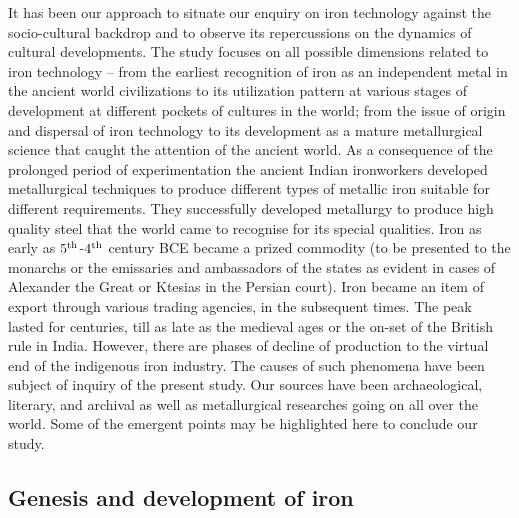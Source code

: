 It has been our approach to situate our enquiry on iron technology against the socio-cultural backdrop and to observe its repercussions on the dynamics of cultural developments. The study focuses on all possible dimensions related to iron technology – from the earliest recognition of iron as an independent metal in the ancient world civilizations to its utilization pattern at various stages of development at different pockets of cultures in the world; from the issue of origin and dispersal of iron technology to its development as a mature metallurgical science that caught the attention of the ancient world. As a consequence of the prolonged period of experimentation the ancient Indian ironworkers developed metallurgical techniques to produce different types of metallic iron suitable for different requirements. They successfully developed metallurgy to produce high quality steel that the world came to recognise for its special qualities. Iron as early as $5^{\rm th}$-$4^{\rm th}$ century BCE became a prized commodity (to be presented to the monarchs or the emissaries and ambassadors of the states as evident in cases of Alexander the Great or Ktesias in the Persian court). Iron became an item of export through various trading agencies, in the subsequent times. The peak lasted for centuries, till as late as the medieval ages or the on-set of the British rule in India. However, there are phases of decline of production to the virtual end of the indigenous iron industry. The causes of such phenomena have been subject of inquiry of the present study. Our sources have been archaeological, literary, and archival as well as metallurgical researches going on all over the world. Some of the emergent points may be highlighted here to conclude our study.

\vspace{-.3cm}

\subsection*{Genesis and development of iron}\label{chapter8-subsection-1}

\vspace{-.2cm}

